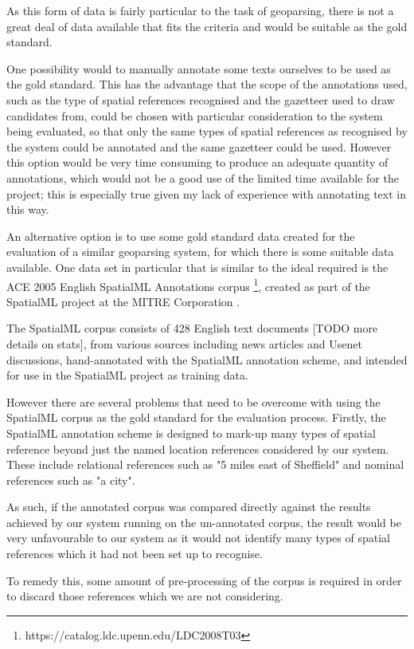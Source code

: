 \documentclass[12pt, a4paper]{report}
\begin{document}
As this form of data is fairly particular to the task of geoparsing, there is not a great deal of data available that fits the criteria and would be suitable as the gold standard.

One possibility would to manually annotate some texts ourselves to be used as the gold standard. This has the advantage that the scope of the annotations used, such as the type of spatial references recognised and the gazetteer used to draw candidates from, could be chosen with particular consideration to the system being evaluated, so that only the same types of spatial references as recognised by the system could be annotated and the same gazetteer could be used. However this option would be very time consuming to produce an adequate quantity of annotations, which would not be a good use of the limited time available for the project; this is especially true given my lack of experience with annotating text in this way. 

An alternative option is to use some gold standard data created for the evaluation of a similar geoparsing system, for which there is some suitable data available. One data set in particular that is similar to the ideal required is the ACE 2005 English SpatialML Annotations corpus \footnote{https://catalog.ldc.upenn.edu/LDC2008T03}, created as part of the SpatialML project at the MITRE Corporation \citep{mani2010}.

The SpatialML corpus consists of 428 English text documents [TODO more details on stats], from various sources including news articles and Usenet discussions, hand-annotated with the SpatialML annotation scheme, and intended for use in the SpatialML project as training data.

However there are several problems that need to be overcome with using the SpatialML corpus as the gold standard for the evaluation process. Firstly, the SpatialML annotation scheme is designed to mark-up many types of spatial reference beyond just the named location references considered by our system. These include relational references such as "5 miles east of Sheffield" and nominal references such as "a city".

As such, if the annotated corpus was compared directly against the results achieved by our system running on the un-annotated corpus, the result would be very unfavourable to our system as it would not identify many types of spatial references which it had not been set up to recognise.

To remedy this, some amount of pre-processing of the corpus is required in order to discard those references which we are not considering.
\end{document}
